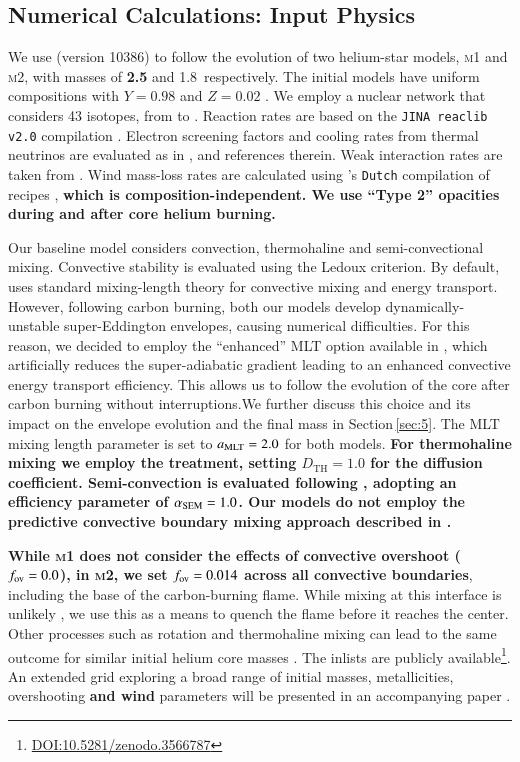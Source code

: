 \documentclass[twocolumn]{aa}
\begin{document}
\subsection{Numerical Calculations: Input Physics}\label{sec:2.1}
We use \mesa (version 10386) to follow the evolution of two helium-star models, \textsc{m1} and \textsc{m2}, with  masses of  {\bf 2.5} and 1.8\msun\ respectively. 
The initial models have uniform compositions with $Y=0.98$ and $Z=0.02$ \citep[solar abundances are taken from ][]{grevesse1998}. We employ a nuclear network that considers 43  isotopes, from  to . Reaction rates are based on the \texttt{JINA reaclib v2.0} compilation \citep{cyburt2010}. Electron screening factors and cooling rates from thermal neutrinos are evaluated as in \cite{Farmer:2015afs}, and references therein. 
Weak interaction rates are taken from \cite{Suzuki:2015iry}. 
Wind mass-loss rates are calculated using \mesa's \texttt{Dutch} compilation of recipes  \citep{Paxton:2013pj}, {\bf which is composition-independent. We use ``Type 2'' opacities during and after core helium burning.}

Our baseline  model considers convection, thermohaline and semi-convectional mixing. Convective stability is 
evaluated using the Ledoux criterion. By default, \mesa uses  standard mixing-length theory  \citep[MTL;][]{cox1968} for convective mixing and energy transport. However, following carbon burning, both our models develop 
dynamically-unstable super-Eddington envelopes, causing numerical 
difficulties. For this reason, we decided to employ the ``enhanced'' MLT 
option available in \mesa \citep{Paxton:2013pj}, which artificially reduces 
the super-adiabatic gradient leading to  an enhanced convective energy 
transport efficiency.  This  allows us to follow the evolution of the core 
after carbon burning without interruptions.We further discuss this choice and its impact on the envelope evolution and the final mass in Section\,\ref{sec:5}. 
The MLT mixing length parameter is set to $a_{\rm MLT}=2.0$ for both models. {\bf For 
thermohaline mixing we employ 
the \cite{kippenhahn1980} 
 treatment, setting $D_{\text{TH}} = 1.0$ for the diffusion coefficient. Semi-convection is evaluated following \cite{langer1983}, adopting an efficiency parameter of $\alpha_{{\rm SEM}} = 1.0$. Our models do not employ the predictive convective boundary mixing approach described in \cite{Paxton:2017eie}.} 

{\bf While \textsc{m1} does not consider the effects of convective overshoot ($f_{\rm ov}=0.0$), in \textsc{m2}, we set $f_{\rm ov}=0.014$ across all convective boundaries}, including the base of the 
carbon-burning flame. While mixing at this interface is unlikely \citep{lecoanet2016}, 
we use this as a means to  quench the flame before it reaches the center.  
Other processes such as rotation and thermohaline mixing can lead to the 
same outcome for similar initial helium core masses \citep{Farmer:2015afs}.
The \mesa inlists are publicly available\footnote{\url{DOI:10.5281/zenodo.3566787}}. 
An  extended grid exploring a broad range of initial masses, 
metallicities, overshooting {\bf and wind} parameters will be presented in an 
accompanying paper \citep{chanlaridis2019}.       
\end{document}

